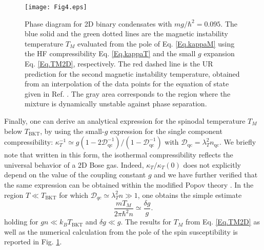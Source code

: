 \documentclass[pra,twocolumn,aps,showpacs,longbibliography]{revtex4-1}
\begin{document}
\par
\begin{figure}[t]
\begin{center}
\texttt{[image: Fig4.eps]}
\caption{Phase diagram for 2D binary condensates with $mg/\hbar^2=0.095$. The blue solid and the green dotted lines are the magnetic instability temperature $T_M$ evaluated from the pole of Eq. \eqref{Eq.kappaM} using the HF compressibility Eq. \eqref{Eq.kappaT} and the small $g$ expansion Eq. \eqref{Eq.TM2D}, respectively. The red dashed line is the UR prediction for the second magnetic instability temperature, obtained from an interpolation of the data points for the equation of state given in Ref. \cite{Prokofev2002}.  The gray area corresponds to the region where the mixture is dynamically unstable against phase separation.} 
\label{fig:phaseDiag2D}
\end{center}
\end{figure}
Finally, one can derive an analytical expression for the spinodal temperature $T_M$ below $T_\mathrm{BKT}$, by using the small-$g$ expression for the single component compressibility: $\kappa_T^{-1} \simeq g(1-2\mathcal{D}_\mathrm{qc}^{-1})/(1-\mathcal{D}_\mathrm{qc}^{-1})$ with $\mathcal{D}_\mathrm{qc}=\lambda_T^2 n_\mathrm{qc}$. We briefly note that written in this form, the isothermal compressibility reflects the universal behavior of a 2D Bose gas. Indeed, $\kappa_T/\kappa_T(0)$ does not explicitly depend on the value of the coupling constant $g$ and we have further verified that the same expression can be obtained within the modified Popov theory \cite{andersen_02, khawaja_02, Lim2008}. In the region $T \ll T_\mathrm{BKT}$ for which $\mathcal{D}_{qc} \simeq \lambda_T^2 n  \gg 1$, one obtains the simple estimate
\begin{equation}\label{Eq.TM2D}
\frac{m T_M}{2\pi\hbar^2n} \simeq \frac{\delta g}{g}.
\end{equation}
holding for $gn \ll k_B T_\mathrm{BKT}$ and $\delta g \ll g$. The results for $T_M$ from Eq. \eqref{Eq.TM2D} as well as the numerical calculation from the pole of the spin susceptibility is reported in Fig. \ref{fig:phaseDiag2D}.
\par
\end{document}
